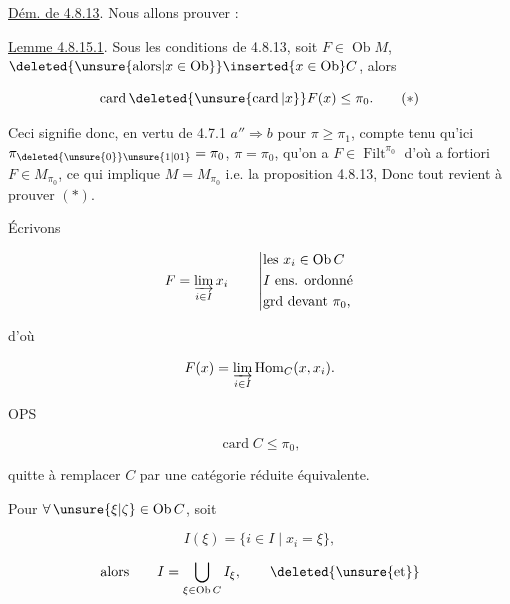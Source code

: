 
 \uline{Dém. de 4.8.13}. Nous allons  prouver :

\uline{Lemme 4.8.15.1}. Sous les conditions de 4.8.13, soit $F\in\operatorname{Ob}M$, $\deleted{\unsure{\text{alors}|x\in\operatorname{Ob}}}\inserted{x\in\operatorname{Ob}}C$, alors

\[
\operatorname{card}\deleted{\unsure{\operatorname{card}|x}}F(x)\leq\pi_0.\tag*{($\ast$)}
\]

Ceci signifie donc, en vertu de 4.7.1 $a''\Longrightarrow b$ pour $\pi\geq\pi_1$, compte tenu qu'ici $\pi_{\deleted{\unsure{0}}\unsure{1|01}}=\pi_0$, $\pi=\pi_0$, qu'on a $F\in\operatorname{Filt}^{\pi_0}$ d'où a fortiori $F\in M_{\pi_0}$, ce qui  implique $M=M_{\pi_0}$ i.e. la proposition 4.8.13,  Donc tout revient à prouver $(\ast)$.

Écrivons

\[
F=\varinjlim_{i\in I}x_i\qquad \left|\begin{aligned}&\text{les }x_i\in\operatorname{Ob}C\\ &I\ \text{ens. ordonné}\\ &\text{grd devant }\pi_0,\end{aligned}\right.
\]

d'où

\[
F(x)=\varinjlim_{i\in I}\operatorname{Hom}_C(x,x_i).
\]

OPS

\[
\operatorname{card}C\leq\pi_0,
\]

quitte à remplacer $C$ par une catégorie réduite équivalente.

Pour $\forall\,\unsure{\xi|\zeta}\in\operatorname{Ob}C$, soit 

\[
I(\xi)=\{i\in I\mid x_i=\xi\},
\]

\[
\text{alors}\qquad I=\bigcup_{\xi\in\operatorname{Ob}C}I_\xi,\qquad\deleted{\unsure{\text{et}}}
\]
